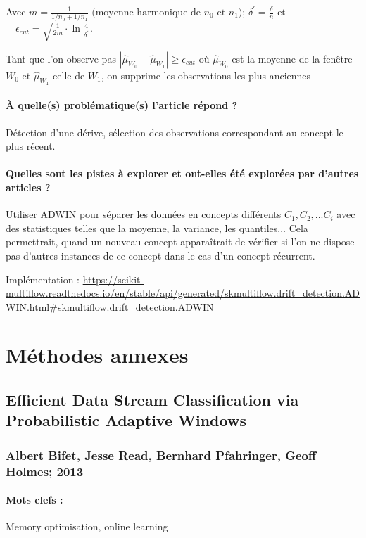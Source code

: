 \documentclass[11pt,a4paper]{report}
\begin{document}
Avec $m=\frac{1}{1 / n_{0}+1 / n_{1}} \text { (moyenne harmonique de } n_{0} \text { et } n_{1} )  $; $\delta^{\prime}=\frac{\delta}{n} \text{ et } $ $ \quad \epsilon_{c u t}=\sqrt{\frac{1}{2 m} \cdot \ln \frac{4}{\delta^{\prime}}}$. 

Tant que l'on observe pas $\left|\hat{\mu}_{W_{0}}-\hat{\mu}_{W_{1}}\right| \geq \epsilon_{c u t}$ où $\hat{\mu}_{W_{0}}$ est la moyenne de la fenêtre $W_0$ et $\hat{\mu}_{W_{1}}$ celle de $W_1$, on supprime les observations les plus anciennes

\paragraph{À quelle(s) problématique(s) l'article répond ?} Détection d'une dérive, sélection des observations correspondant au concept le plus récent.

\paragraph{Quelles sont les pistes à explorer et ont-elles  été explorées par d'autres articles ?} Utiliser ADWIN pour séparer les données en concepts différents $C_1, C_2, ... C_i$ avec des statistiques telles que la moyenne, la variance, les quantiles... Cela permettrait, quand un nouveau concept apparaîtrait de vérifier si l'on ne dispose pas d'autres instances de ce concept dans le cas d'un concept récurrent.

Implémentation : \url{https://scikit-multiflow.readthedocs.io/en/stable/api/generated/skmultiflow.drift_detection.ADWIN.html#skmultiflow.drift_detection.ADWIN}


\section{Méthodes annexes}

\subsection{Efficient Data Stream Classification via Probabilistic Adaptive Windows}
\subsubsection{Albert Bifet, Jesse Read, Bernhard Pfahringer, Geoff Holmes; 2013}

\paragraph{Mots clefs :}Memory optimisation, online learning 
\end{document}
